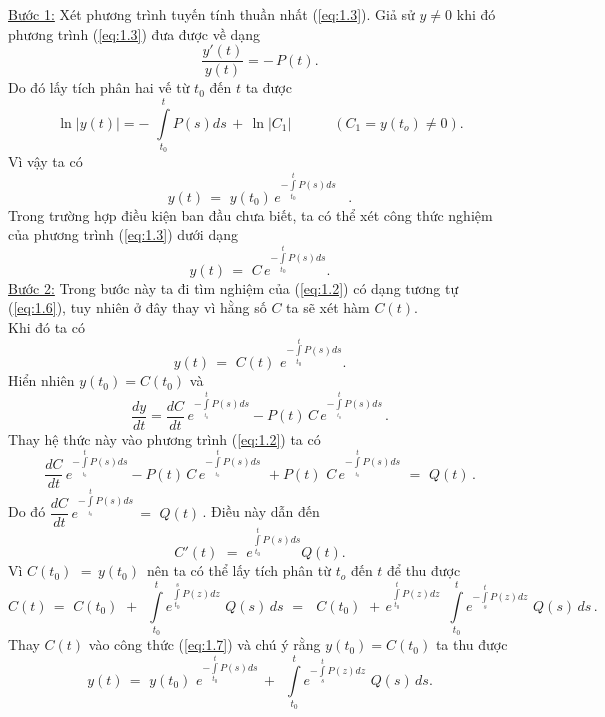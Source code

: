 \underline{Bước 1:} Xét phương trình tuyến tính thuần nhất (\ref{eq:1.3}). Giả sử $y\ne 0$  khi đó phương trình  (\ref{eq:1.3}) đưa được về dạng $$\frac{y'(t)}{y(t)}  =-\,P(t).$$
Do đó lấy tích phân hai vế từ ${{t}_{0}}$ đến $t$ ta được 
\[\ln\left| y(t) \right|=-\,\,\int\limits_{{{t}_{0}}}^{t}{P(s)ds\,+\,\ln |{{C}_{1}}|\,\,\,\,\,\,\,\,\,\,\,\,\,\,\,\,\,\,({{C}_{1}}=y({{t}_{o}})\ne 0).}\]
Vì vậy ta có                           
\begin{equation}
	y(t)\,=\,\,y({{t}_{0}})\,{{e}^{-\int\limits_{{{t}_{0}}}^{t}{P(s)ds}}}\,\,\,\,\,.  
	\label{eq:1.5}
\end{equation}                                   Trong trường hợp điều kiện ban đầu chưa biết, ta có thể xét công thức nghiệm của phương trình (\ref{eq:1.3}) dưới dạng 
\begin{equation}
	y(t)\,=\,\,C\,{{e}^{-\int\limits_{{{t}_{0}}}^{t}{P(s)ds}}}.
\label{eq:1.6}
\end{equation}
\underline{Bước 2:} Trong bước này ta đi tìm nghiệm của (\ref{eq:1.2}) có dạng tương tự (\ref{eq:1.6}), tuy nhiên ở đây thay vì hằng số $C$ ta sẽ xét hàm $C(t)$. \\
Khi đó ta có
\begin{equation}
	y(t)\,=\,\,C(t)\,\,{{e}^{-\int\limits_{{{t}_{0}}}^{t}{P(s)ds}}}.
	\label{eq:1.7}
\end{equation}
Hiển nhiên $y({{t}_{0}})=C({{t}_{0}})$ và \[\frac{dy}{dt}=\dfrac{dC}{dt}\,{{e}^{-\int\limits_{_{{{t}_{0}}}}^{t}{P(s)ds}}}-P(t)\,C\,{{e}^{-\int\limits_{_{{{t}_{0}}}}^{t}{P(s)ds}}}\,.\]
Thay hệ thức này vào phương trình (\ref{eq:1.2}) ta có \[\dfrac{dC}{dt}\,{{e}^{-\int\limits_{_{{{t}_{0}}}}^{t}{P(s)ds}}}-P(t)\,C\,{{e}^{-\int\limits_{_{{{t}_{0}}}}^{t}{P(s)ds}}}\,\,+P(t)\,\,C\,{{e}^{-\int\limits_{_{{{t}_{0}}}}^{t}{P(s)ds}}}\,\,=\,\,Q(t)\,.\]
Do đó $\dfrac{dC}{dt}\,{{e}^{-\int\limits_{_{{{t}_{0}}}}^{t}{P(s)ds}}}\,=\,\,Q(t)\,$. Điều này dẫn đến \[C'(t)\,\,=\,\,{{e}^{\int\limits_{{{t}_{0}}}^{t}{P(s)ds}}}Q(t).\]
Vì $C({{t}_{0}})\,\,=\,y({{t}_{0}})\,$ nên ta có thể lấy tích phân từ ${{t}_{o}}$ đến $t$ để thu được \[C(t)\,=\,\,C({{t}_{0}})\,\,+\,\,\,\int\limits_{{{t}_{0}}}^{t}{{{e}^{\int\limits_{{{t}_{0}}}^{s}{P(z)dz}}}}\,\,Q(s)\,ds\,\,=\,\,\,\,C({{t}_{0}})\,\,+\,{{e}^{\int\limits_{{{t}_{0}}}^{t}{P(z)dz}}}\,\,\,\int\limits_{{{t}_{0}}}^{t}{{{e}^{-\int\limits_{s}^{t}{P(z)dz}}}}\,\,Q(s)\,ds\,.\]
Thay $C(t)$ vào công thức (\ref{eq:1.7}) và chú ý rằng $y({{t}_{0}})=C({{t}_{0}})$ ta thu được 
\begin{equation}
	y(t)\,=\,\,y({{t}_{0}})\,\,{{e}^{-\int\limits_{{{t}_{0}}}^{t}{P(s)ds}}}\,+\,\,\,\int\limits_{{{t}_{0}}}^{t}{{{e}^{-\int\limits_{s}^{t}{P(z)dz}}}}\,\,Q(s)\,ds.
	\label{eq:1.8}
\end{equation}

